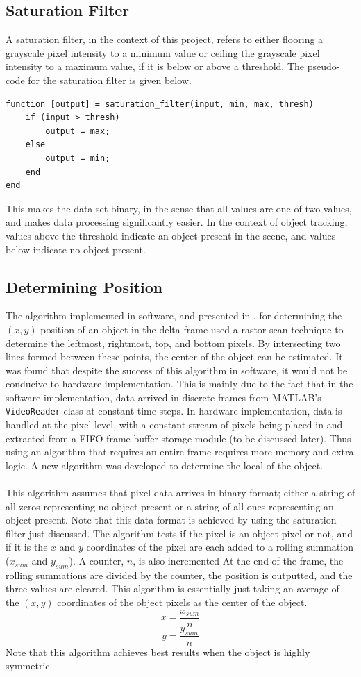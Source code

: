 \documentclass[11pt]{article} %
\begin{document}
\subsection{Saturation Filter}
A saturation filter, in the context of this project, refers to either flooring a grayscale pixel intensity to a minimum value or ceiling the grayscale pixel intensity to a maximum value, if it is below or above a threshold. The pseudo-code for the saturation filter is given below.
\begin{lstlisting}
function [output] = saturation_filter(input, min, max, thresh)
	if (input > thresh)
		output = max;
	else
		output = min;
	end
end
\end{lstlisting} 
This makes the data set binary, in the sense that all values are one of two values, and makes data processing significantly easier. In the context of object tracking, values above the threshold indicate an object present in the scene, and values below indicate no object present.
\subsection{Determining Position}
The algorithm implemented in software, and presented in \cite{phase1}, for determining the $(x,y)$ position of an object in the delta frame used a rastor scan technique to determine the leftmost, rightmost, top, and bottom pixels. By intersecting two lines formed between these points, the center of the object can be estimated. It was found that despite the success of this algorithm in software, it would not be conducive to hardware implementation. This is mainly due to the fact that in the software implementation, data arrived in discrete frames from MATLAB's \texttt{VideoReader} class at constant time steps. In hardware implementation, data is handled at the pixel level, with a constant stream of pixels being placed in and extracted from a FIFO frame buffer storage module (to be discussed later). Thus using an algorithm that requires an entire frame requires more memory and extra logic. A new algorithm was developed to determine the local of the object. \\\\
This algorithm assumes that pixel data arrives in binary format; either a string of all zeros representing no object present or a string of all ones representing an object present. Note that this data format is achieved by using the saturation filter just discussed. The algorithm tests if the pixel is an object pixel or not, and if it is the $x$ and $y$ coordinates of the pixel are each added to a rolling summation ($x_{sum}$ and $y_{sum}$). A counter, $n$, is also incremented At the end of the frame, the rolling summations are divided by the counter, the position is outputted, and the three values are cleared. This algorithm is essentially just taking an average of the $(x,y)$ coordinates of the object pixels as the center of the object.
\begin{equation}
x = \frac{x_{sum}}{n}
\end{equation} 
\begin{equation}
y = \frac{y_{sum}}{n}
\end{equation} 
Note that this algorithm achieves best results when the object is highly symmetric.
\end{document}
